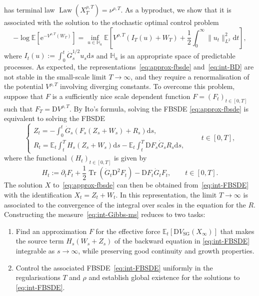 \documentclass[11pt, a4paper]{scrartcl}
\numberwithin{equation}{section}
\theoremstyle{plain}
\theoremstyle{remark}
\newcommand{\assign}{:=}
\newcommand{\mathD}{\mathrm{D}}
\newcommand{\mathd}{\mathrm{d}}
\newcommand{\mathe}{\mathrm{e}}
\newcommand{\tmop}[1]{\ensuremath{\operatorname{#1}}}
\newcommand{\tmtextit}[1]{\text{{\itshape{#1}}}}
\begin{document}
has terminal law $\tmop{Law} (X_T^{\rho, T}) = \nu^{\rho, T}$. As a byproduct, we show
that it is associated with the solution to the stochastic optimal control
problem
\begin{equation}
  - \log \mathbb{E} [\mathe^{- V^{\rho, T} (W_T)}] = \inf_{u \in \mathbb{H}_a}
  \mathbb{E} \left[ V^{\rho, T} (I_T (u) + W_T) + \frac{1}{2} \int_0^{\infty}
  \| u_t \|^2_{L^2} \mathd t \right] \label{eq:int-BD},
\end{equation}
where $I_t (u) \assign \int_0^t \dot{G}^{1 / 2}_s u_s \mathd s$ and
$\mathbb{H}_a$ is an appropriate space of predictable processes. As expected,
the representations~\eqref{eq:approx-fbsde} and~\eqref{eq:int-BD} are not
stable in the small-scale limit $T \rightarrow \infty$, and they require a
renormalisation of the potential $V^{\rho, T}$ involving diverging constants.
To overcome this problem, suppose that $F$ is a sufficiently nice scale
dependent function $F = (F_t)_{t \in [0, T]}$ such that $F_T = \mathD V^{\rho,
T}$. By Ito's formula, solving the FBSDE \eqref{eq:approx-fbsde} is equivalent
to solving the FBSDE
\begin{equation}
  \begin{cases}
    Z_t = - \int_0^t \dot{G}_s (F_s (Z_s + W_s) + R_s) \mathd s,\\
    R_t =\mathbb{E}_t \int_t^T H_s (Z_s + W_s) \mathd s -\mathbb{E}_t \int_t^T
    \mathD F_s  \dot{G}_s R_s \mathd s,
  \end{cases}  \label{eq:int-FBSDE} \qquad t \in [0, T],
\end{equation}
where the functional $(H_t)_{t \in [0, T]}$ is given by
\[ H_t \assign \partial_t F_t + \frac{1}{2} \tmop{Tr} (\dot{G}_t \mathD^2 F_t)
   - \mathD F_t  \dot{G}_t F_t, \qquad t \in [0, T] . \]
The solution $X$ to~\eqref{eq:approx-fbsde} can then be obtained
from~\eqref{eq:int-FBSDE} with the identification $X_t = Z_t + W_t$. In this
representation, the limit $T \rightarrow \infty$ is associated to the
convergence of the integral over scales in the equation for the
\tmtextit{remainder} $R$. Constructing the measure~\eqref{eq:int-Gibbs-ms}
reduces to two tasks:
\begin{enumerate}
  \item Find an approximation $F$ for the effective force $\mathbb{E}_t
  [\mathD V_{\tmop{SG}} (X_{\infty})]$ that makes the source term $H_s (W_s +
  Z_s)$ of the backward equation in \eqref{eq:int-FBSDE} integrable as $s
  \rightarrow \infty$, while preserving good continuity and growth properties.
  
  \item Control the associated FBSDE~\eqref{eq:int-FBSDE} uniformly in the
  regularisations $T$ and $\rho$ and establish global existence for the
  solutions to \eqref{eq:int-FBSDE}.
\end{enumerate}
\end{document}
